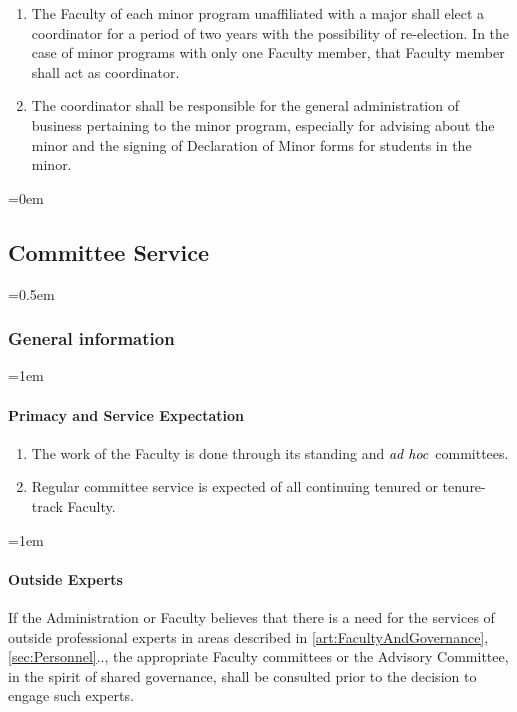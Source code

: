 \documentclass{manual}
\newcommand{\keyword}[1]{\textcolor{black}{#1}}
\newcommand{\adho}{\keyword{\textit{ad hoc}}~}
\let\oldsubsection\subsection
\renewcommand\subsection{\leftskip=0em\oldsubsection}
\let\oldsubsubsection\subsubsection
\renewcommand\subsubsection{\leftskip=0.5em\oldsubsubsection}
\let\oldparagraph\paragraph
\renewcommand\paragraph{\leftskip=1em\oldparagraph}
\newcommand{\itemLevelA}{\alph*.}
\newcommand{\itemRefA}{\alph*}
\begin{document}
				\begin{enumerate}[label=\itemLevelA,ref=\itemRefA]
				\item The Faculty of each minor program unaffiliated with a major shall elect a coordinator for a period of two years with the possibility of re-election. In the case of minor programs with only one Faculty member, that Faculty member shall act as coordinator.
				\item The coordinator shall be responsible for the general administration of business pertaining to the minor program, especially for advising about the minor and the signing of Declaration of Minor forms for students in the minor.
				\end{enumerate}

	\subsection{Committee Service}\label{sec:CommitteeService}

		\subsubsection{General information}\label{sub:GeneralInformation}

			\paragraph{Primacy and Service Expectation}

				\begin{enumerate}[label=\itemLevelA,ref=\itemRefA]
				\item The work of the Faculty is done through its standing and \adho committees.
				\item Regular committee service is expected of all continuing tenured or tenure-track Faculty.
				\end{enumerate}

			\paragraph{Outside Experts}
			If the Administration or Faculty believes that there is a need for the services of outside professional experts in areas described in \cref{art:FacultyAndGovernance}, \cref{sec:Personnel}.., the appropriate Faculty committees or the Advisory Committee, in the spirit of shared governance, shall be consulted prior to the decision to engage such experts.
\end{document}

